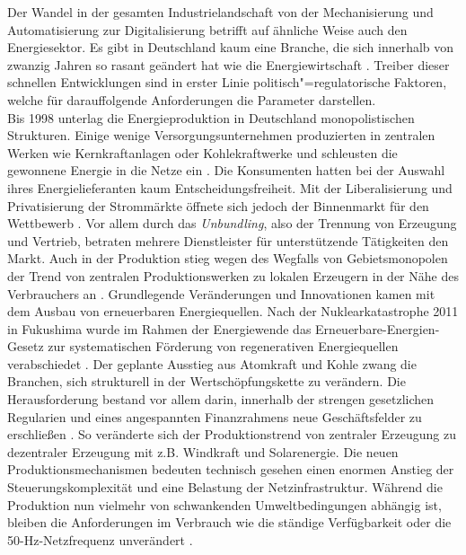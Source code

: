 Der Wandel in der gesamten Industrielandschaft von der Mechanisierung und Automatisierung zur Digitalisierung betrifft auf ähnliche Weise auch den Energiesektor. Es gibt in Deutschland kaum eine Branche, die sich innerhalb von zwanzig Jahren so rasant geändert hat wie die Energiewirtschaft \citep{Doleski2015}. Treiber dieser schnellen Entwicklungen sind in erster Linie politisch"=regulatorische Faktoren, welche für darauffolgende Anforderungen die Parameter darstellen.
\\Bis 1998 unterlag die Energieproduktion in Deutschland monopolistischen Strukturen. Einige wenige Versorgungsunternehmen produzierten in zentralen Werken wie Kernkraftanlagen oder Kohlekraftwerke und schleusten die gewonnene Energie in die Netze ein \citep{Utecht2018}. Die Konsumenten hatten bei der Auswahl ihres Energielieferanten kaum Entscheidungsfreiheit. Mit der Liberalisierung und Privatisierung der Strommärkte öffnete sich jedoch der Binnenmarkt für den Wettbewerb \citep{Doleski2017}. Vor allem durch das \textit{Unbundling}, also der Trennung von Erzeugung und Vertrieb, betraten mehrere Dienstleister für unterstützende Tätigkeiten den Markt. Auch in der Produktion stieg wegen des Wegfalls von Gebietsmonopolen der Trend von zentralen Produktionswerken zu lokalen Erzeugern in der Nähe des Verbrauchers an \citep{Utecht2018}. Grundlegende Veränderungen und Innovationen kamen mit dem Ausbau von erneuerbaren Energiequellen. Nach der Nuklearkatastrophe 2011 in Fukushima wurde im Rahmen der Energiewende das Erneuerbare-Energien-Gesetz zur systematischen Förderung von regenerativen Energiequellen verabschiedet \citep{Doleski2015}. Der geplante Ausstieg aus Atomkraft und Kohle zwang die Branchen, sich strukturell in der Wertschöpfungskette zu verändern. Die Herausforderung bestand vor allem darin, innerhalb der strengen gesetzlichen Regularien und eines angespannten Finanzrahmens neue Geschäftsfelder zu erschließen \citep{Doleski2015}. So veränderte sich der Produktionstrend von zentraler Erzeugung zu dezentraler Erzeugung mit z.B. Windkraft und Solarenergie. Die neuen Produktionsmechanismen bedeuten technisch gesehen einen enormen Anstieg der Steuerungskomplexität und eine Belastung der Netzinfrastruktur. Während die Produktion nun vielmehr von schwankenden Umweltbedingungen abhängig ist, bleiben die Anforderungen im Verbrauch wie die ständige Verfügbarkeit oder die 50-Hz-Netzfrequenz unverändert \citep{Utecht2018}.
\\\\
